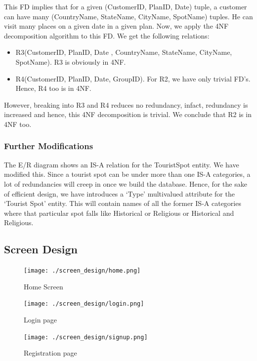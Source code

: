 \documentclass[11pt]{article}
\begin{document}
\begin{itemize}
This FD implies that for a given (CustomerID, PlanID, Date) tuple, a customer can have many (CountryName, StateName, CityName, SpotName) tuples. He can visit many places on a given date in a given plan. Now, we apply the 4NF decomposition algorithm to this FD. We get the following relations:
\begin{itemize}
\item R3(CustomerID, PlanID, Date , CountryName, StateName, CityName, SpotName). R3 is obviously in 4NF.
\item R4(CustomerID, PlanID, Date, GroupID). For R2, we have only trivial FD’s. Hence, R4 too is in 4NF.
\end{itemize}
However, breaking into R3 and R4 reduces no redundancy, infact, redundancy is increased and hence, this 4NF decomposition is trivial. We conclude that R2 is in 4NF too. \newline
\end{itemize}

\subsubsection*{Further Modifications}
The E/R diagram shows an IS-A relation for the TouristSpot entity. We have modified this. Since a tourist spot can be under more than one IS-A categories, a lot of redundancies will creep in once we build the database. Hence, for the sake of efficient design, we have introduces a ‘Type’ multivalued attribute for the ‘Tourist Spot’ entity. This will contain names of all the former IS-A categories where that particular spot falls like Historical or Religious or Historical and Religious.

\subsection{Screen Design}
\begin{figure}[ht!]
\hfill\texttt{[image: ./screen\_design/home.png]}\hspace*{\fill}
\caption{Home Screen}
\end{figure}

\begin{figure}[ht!]
\hfill\texttt{[image: ./screen\_design/login.png]}\hspace*{\fill}
\caption{Login page}
\end{figure}

\begin{figure}[ht!]
\hfill\texttt{[image: ./screen\_design/signup.png]}\hspace*{\fill}
\caption{Registration page}
\end{figure}
\end{document}
